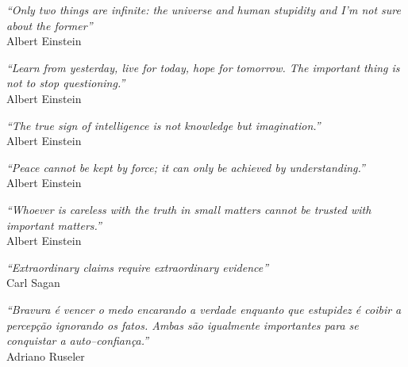 \documentclass[
10.5pt, %
a5paper, %
twoside, %
english,
brazil,
sumario=UFSC,
chapter=TITLE, %
section=TITLE  %
]{ufsc-inep-thesis}
\begin{document}
\begin{epigrafe}
	\vspace*{\fill}
	\begin{flushright}
		\textit{``Only two things are infinite: the universe and human stupidity and I'm not sure about the former''}\\Albert Einstein
	\end{flushright}
	\begin{flushright}
		\textit{``Learn from yesterday, live for today, hope for tomorrow. The important thing is not to stop questioning.''}\\	Albert Einstein		
	\end{flushright}
	\begin{flushright}
		\textit{``The true sign of intelligence is not knowledge but imagination.''}\\	Albert Einstein		
	\end{flushright}
	\begin{flushright}
		\textit{``Peace cannot be kept by force; it can only be achieved by understanding.''}\\	Albert Einstein		
	\end{flushright}
	\begin{flushright}
		\textit{``Whoever is careless with the truth in small matters cannot be trusted with important matters.''}\\	Albert Einstein		
	\end{flushright}		
	\begin{flushright}
		\textit{``Extraordinary claims require extraordinary evidence''}\\
		Carl Sagan
	\end{flushright}
	\begin{flushright}
		\textit{``Bravura é vencer o medo encarando a verdade enquanto que estupidez é coibir a percepção ignorando os fatos. Ambas são igualmente importantes para se conquistar a auto--confiança.''}\\
		Adriano Ruseler
	\end{flushright}
	

\end{epigrafe}
\end{document}
